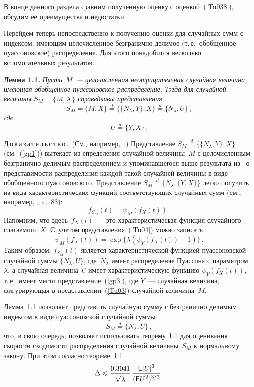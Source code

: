 \begin{multicols}{2}
\medskip

В конце данного раздела сравним полученную оценку с оценкой~(\ref{Tu038}), обсудим ее преимущества и недостатки.

Перейдем теперь непосредственно к получению оценки для случайных
сумм с индексом, имеющим целочисленное безгранично делимое (т.\,е.\ обобщенное пуассоновское) распределение. Для этого
понадобится несколько вспомогательных результатов.

\medskip

\noindent
\textbf{Лемма 1.1.} \textit{Пусть~$M$~--- целочисленная неотрицательная случайная величина,
имеющая обобщенное пуассоновское распределение. Тогда для
случайной величины $S_M=\{M,X\}$ справедливы представления
\begin{equation*}
S_M=\{M,X\}\stackrel{d}{=}\{\{N_{\lambda},Y\},X\}\stackrel{d}{=}\{N_{\lambda},U\}\,,
\end{equation*}
где
\begin{equation}
U \stackrel{d}{=}\{Y,X\}\,.
\label{gp3}
\end{equation}
}

\vspace*{-6pt}

\noindent
Д\,о\,к\,а\,з\,а\,т\,е\,л\,ь\,с\,т\,в\,о\,.\ (См., например,~\cite{1g}.) Представление
$S_M\stackrel{d}{=}\{\{N_{\lambda},Y\},X\}$ (см.~(\ref{gp1}))
вытекает из определения случайной величины~$M$ с целочисленным
безгранично делимым распределением и упоминавшегося выше
результата из~\cite{4g} о представимости распределения каждой такой
случайной величины в виде обобщенного пуассоновского.
Представление $S_M\stackrel{d}{=}\{N_{\lambda},\{Y,X\}\}$ легко
получить из вида характеристических функций соответствующих
случайных сумм (см., например,~\cite{1g}, с.~83):
$$
f_{S_{M}}(t)=\psi_M(f_X(t))\,.
$$
Напомним, что здесь~$f_X(t)$~--- это характеристическая функция
случайного слагаемого~$X$. С~учетом представления~(\ref{Tu04})
можно записать
$$
\psi_M(f_X(t))=\exp\{\lambda(\psi_Y(f_X(t))-1)\}\,.
$$
Таким образом, $f_{S_{M}}(t)$ является характеристической функцией
пуассоновской случайной суммы $\{N_\lambda,U\}$, где~$N_\lambda$
имеет распределение Пуассона с параметром~$\lambda$, а случайная
величина~$U$ имеет характеристическую функцию $\psi_Y(f_X(t))$, т.\,е.\
 имеет место представление~(\ref{gp3}), где $Y$~--- случайная
величина, фигурирующая в представлении~(\ref{Tu03}) случайной
величины~$M$.

\medskip


Лемма~1.1 позволяет представить случайную сумму с безгранично
делимым индексом в виде пуассоновской случайной суммы
$$
S_M\stackrel{d}{=}\{N_\lambda,U\}\,,
$$
что, в свою очередь, позволяет использовать теорему~1.1 для
оценивания скорости сходимости распределения случайной величины~$S_M$ 
к нормальному закону. При этом согласно теореме~1.1
$$
\Delta\leqslant \displaystyle\frac{\displaystyle 0{,}3041\mathstrut}{\displaystyle \sqrt{\lambda}\mathstrut}\,\displaystyle\frac{\displaystyle {\sf E}
|U|^3\mathstrut}{\displaystyle ({\sf E} U^2)^{3/2}\mathstrut}\,.
$$


\end{multicols}

